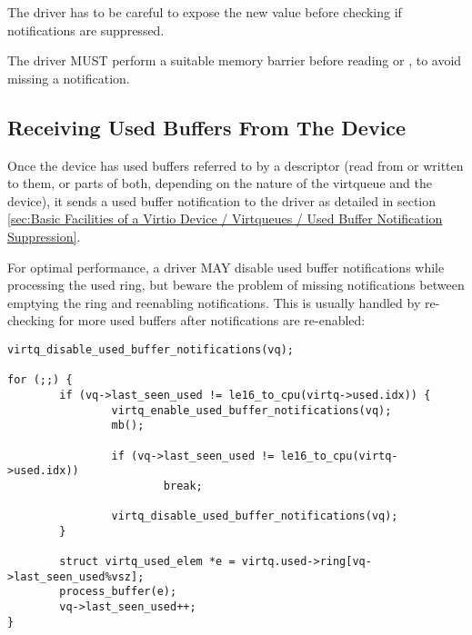 The driver has to be careful to expose the new 
value before checking if notifications are suppressed.

The driver MUST perform a suitable memory barrier before reading  or
, to avoid missing a notification.

\subsection{Receiving Used Buffers From The Device}\label{sec:Basic Facilities of a Virtio Device / Virtqueues / Receiving Used Buffers From The Device}

Once the device has used buffers referred to by a descriptor (read from or written to them, or
parts of both, depending on the nature of the virtqueue and the
device), it sends a used buffer notification to the driver as detailed
in section \ref{sec:Basic Facilities of a Virtio Device / Virtqueues /
Used Buffer Notification Suppression}.

\begin{note}

For optimal performance, a driver MAY disable used buffer notifications
while processing the used ring, but beware the problem of missing
notifications between emptying the ring and reenabling notifications.  This
is usually handled by re-checking for more used buffers after
notifications are re-enabled:

\begin{lstlisting}
virtq_disable_used_buffer_notifications(vq);

for (;;) {
        if (vq->last_seen_used != le16_to_cpu(virtq->used.idx)) {
                virtq_enable_used_buffer_notifications(vq);
                mb();

                if (vq->last_seen_used != le16_to_cpu(virtq->used.idx))
                        break;

                virtq_disable_used_buffer_notifications(vq);
        }

        struct virtq_used_elem *e = virtq.used->ring[vq->last_seen_used%vsz];
        process_buffer(e);
        vq->last_seen_used++;
}
\end{lstlisting}
\end{note}

